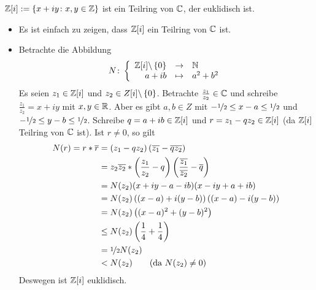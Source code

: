 \begin{exercisePage}
    \pagebreak
    
    \begin{exercise}
        $\mathbb{Z} [i] := \left\{ x + iy \colon x,y \in \mathbb{Z} \right\}$ ist ein Teilring von $\mathbb{C}$, der euklidisch ist.
    \end{exercise}
    \begin{solution}
        \begin{itemize}[leftmargin=*]
            \item Es ist einfach zu zeigen, dass $\mathbb{Z} [i]$ ein Teilring von $\mathbb{C}$ ist.
            \item Betrachte die Abbildung
            \begin{equation*}
                N \colon \left\lbrace \begin{array}{rcl} \mathbb{Z} [i] \backslash \left\{ 0 \right\} & \to & \mathbb{N} \\a+ib & \mapsto & a^2 + b^2 \end{array} \right.
            \end{equation*}
            Es seien $z_1 \in \mathbb{Z} [i]$ und $z_2 \in Z [i] \backslash \left\{ 0 \right\}$. Betrachte $\frac{z_1}{z_2} \in \mathbb{C}$ und schreibe $\frac{z_1}{z_2} = x + iy$ mit $x,y \in \mathbb{R}$. Aber es gibt $a,b \in Z$ mit $-\lfrac{1}{2} \leq x-a \leq \lfrac{1}{2}$ und $-\lfrac{1}{2} \leq y-b \leq \lfrac{1}{2}$. Schreibe $q = a+ib \in \mathbb{Z} [i]$ und $r = z_1 -q z_2 \in \mathbb{Z} [i]$ (da $\mathbb{Z} [i]$ Teilring von $\mathbb{C}$ ist). Ist $r \neq 0$, so gilt
            \begin{equation*}
                \begin{aligned}
                N(r) = r * \quer{r} 
                &= \left( z_1 - q z_2 \right)\left( \quer{z_1} - \quer{q} \quer{z_2} \right) \\
                &= z_2 \quer{z_2} * \left( \frac{z_1}{z_2} - q \right) \left( \frac{\quer{z_1}}{\quer{z_2}} - \quer{q} \right) \\
                &= N(z_2) (x+iy - a - ib) (x-iy + a + ib) \\
                &= N(z_2) \left( (x-a)+i(y-b) \right) \left( (x-a) - i(y-b) \right) \\
                &= N(z_2) \left( (x-a)^2 + (y-b)^2 \right) \\
                &\leq N(z_2) \left( \frac{1}{4} + \frac{1}{4} \right) \\
                &= \lfrac{1}{2} N(z_2) \\
                &< N(z_2) \qquad ( \text{da } N(z_2) \neq 0)
                \end{aligned}
            \end{equation*}
            Deswegen ist $\mathbb{Z} [i]$ euklidisch.
        \end{itemize}
    \end{solution}


\end{exercisePage}
